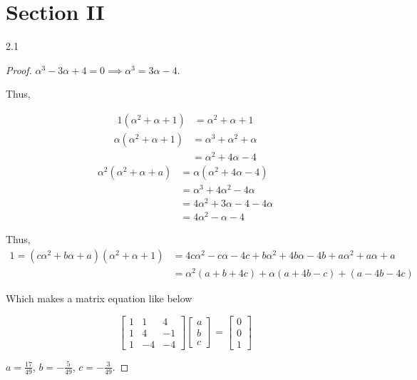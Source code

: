 \documentclass{article}
\begin{document}
\section{Section II}

\begin{PROB}{2.1}\label{Problem 2.1.}
\end{PROB}
\begin{proof}
    $\alpha^3 - 3\alpha + 4 = 0 \implies \alpha^3 = 3\alpha - 4$. 
    
    Thus, 

    \begin{align*}
        1(\alpha^2 + \alpha + 1) &= \alpha^2 + \alpha + 1
    \end{align*}
    \begin{align*}
        \alpha(\alpha^2 + \alpha + 1) 
        &= \alpha^3 + \alpha^2 + \alpha \\
        &= \alpha^2 + 4\alpha - 4
    \end{align*}
    \begin{align*}
        \alpha^2(\alpha^2 + \alpha + a) &= \alpha(\alpha^2 + 4\alpha - 4) \\
        &= \alpha^3 + 4 \alpha^2 - 4\alpha \\
        &= 4\alpha^2 + 3\alpha - 4 - 4\alpha \\
        &= 4 \alpha^2 - \alpha - 4
    \end{align*}

    Thus,
    \begin{align*}
        1 = (c \alpha^2 + b \alpha + a)(\alpha^2 + \alpha + 1) &= 4c \alpha^2 - c\alpha - 4c + b \alpha^2 + 4b \alpha - 4b + a \alpha^2 + a \alpha + a \\
        &=  \alpha^2(a + b + 4c) + \alpha(a + 4b - c) + (a - 4b - 4c)
    \end{align*}

    Which makes a matrix equation like below

    \begin{equation*}
        \begin{bmatrix}
            1 & 1 & 4 \\
            1 & 4 & -1 \\
            1 & -4 & -4
        \end{bmatrix}\begin{bmatrix}
            a \\ b \\ c
        \end{bmatrix} = \begin{bmatrix}
            0 \\ 0 \\ 1
        \end{bmatrix}
    \end{equation*}

    $a = \frac{17}{49}$, $b = -\frac{5}{49}$, $c = -\frac{3}{49}$.  
\end{proof}
\end{document}
